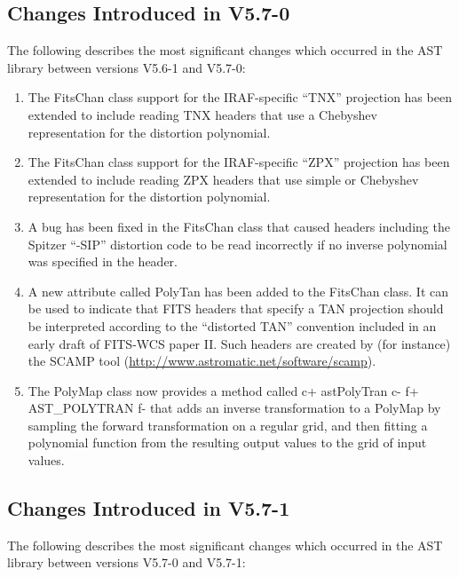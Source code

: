 \documentclass[twoside,11pt]{starlink}
\begin{document}
\subsection{Changes Introduced in V5.7-0}

The following describes the most significant changes which
occurred in the AST library between versions V5.6-1 and V5.7-0:

\begin{enumerate}

\item The FitsChan class support for the IRAF-specific ``TNX'' projection has
been extended to include reading TNX headers that use a Chebyshev
representation for the distortion polynomial.

\item The FitsChan class support for the IRAF-specific ``ZPX'' projection has
been extended to include reading ZPX headers that use simple or Chebyshev
representation for the distortion polynomial.

\item A bug has been fixed in the FitsChan class that caused headers
including the Spitzer ``-SIP'' distortion code to be read incorrectly if no
inverse polynomial was specified in the header.

\item A new attribute called PolyTan has been added to the FitsChan class. It
can be used to indicate that FITS headers that specify a TAN projection
should be interpreted according to the ``distorted TAN'' convention
included in an early draft of FITS-WCS paper II. Such headers are created
by (for instance) the SCAMP tool (\url{http://www.astromatic.net/software/scamp}).

\item The PolyMap class now provides a method called
c+
astPolyTran
c-
f+
AST\_POLYTRAN
f-
that adds an inverse transformation to a PolyMap by sampling the forward
transformation on a regular grid, and then fitting a polynomial function
from the resulting output values to the grid of input values.

\end{enumerate}

\subsection{Changes Introduced in V5.7-1}

The following describes the most significant changes which
occurred in the AST library between versions V5.7-0 and V5.7-1:
\end{document}
